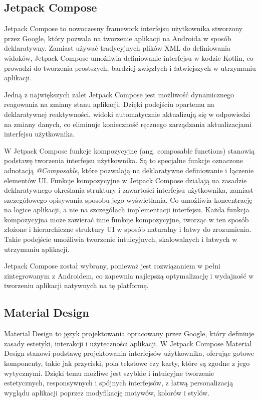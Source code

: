 \documentclass[12pt,twoside]{article}
\begin{document}
\subsection{Jetpack Compose}

Jetpack Compose to nowoczesny framework interfejsu użytkownika stworzony przez Google, który pozwala 
na tworzenie aplikacji na Androida w sposób deklaratywny. Zamiast używać tradycyjnych plików XML do 
definiowania widoków, Jetpack Compose umożliwia definiowanie interfejsu w kodzie Kotlin, co prowadzi 
do tworzenia prostszych, bardziej zwięzłych i łatwiejszych w utrzymaniu aplikacji.

Jedną z największych zalet Jetpack Compose jest możliwość dynamicznego reagowania na zmiany stanu aplikacji. 
Dzięki podejściu opartemu na deklaratywnej reaktywności, widoki automatycznie aktualizują się w odpowiedzi na 
zmiany danych, co eliminuje konieczność ręcznego zarządzania aktualizacjami interfejsu użytkownika.

W Jetpack Compose funkcje kompozycyjne (ang. composable functions) stanowią podstawę tworzenia interfejsu 
użytkownika. Są to specjalne funkcje oznaczone adnotacją \textit{@Composable}, które pozwalają na deklaratywne definiowanie 
i łączenie elementów UI. Funkcje kompozycyjne w Jetpack Compose działają na zasadzie deklaratywnego określania 
struktury i zawartości interfejsu użytkownika, zamiast szczegółowego opisywania sposobu jego wyświetlania. Co 
umożliwia koncentrację na logice aplikacji, a nie na szczegółach implementacji interfejsu. Każda funkcja 
kompozycyjna może zawierać inne funkcje kompozycyjne, tworząc w ten sposób złożone i hierarchiczne struktury UI 
w sposób naturalny i łatwy do zrozumienia. Takie podejście umożliwia tworzenie intuicyjnych, skalowalnych i łatwych 
w utrzymaniu aplikacji.

Jetpack Compose został wybrany, ponieważ jest rozwiązaniem w pełni zintegrowanym z Androidem, 
co zapewnia najlepszą optymalizację i wydajność w tworzeniu aplikacji natywnych na tę platformę.

\subsection{Material Design}

Material Design to język projektowania opracowany przez Google, który definiuje zasady estetyki, interakcji i 
użyteczności aplikacji. W Jetpack Compose Material Design stanowi podstawę projektowania interfejsów użytkownika, 
oferując gotowe komponenty, takie jak przyciski, pola tekstowe czy karty, które są zgodne z jego wytycznymi. 
Dzięki temu możliwe jest szybkie i intuicyjne tworzenie estetycznych, responsywnych i spójnych interfejsów, z 
łatwą personalizacją wyglądu aplikacji poprzez modyfikację motywów, kolorów i stylów.
\end{document}
